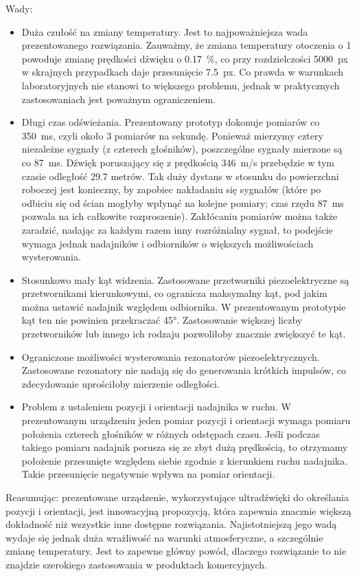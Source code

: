 Wady:
\begin{itemize}
 \item Duża czułość na zmiany temperatury. Jest to najpoważniejsza wada prezentowanego rozwiązania.
 Zauważmy, że zmiana temperatury otoczenia o \SI{1}{\degC} powoduje zmianę prędkości dźwięku o \SI{0,17}{\%},
 co przy rozdzielczości \SI{5000}{px} w skrajnych przypadkach daje przesunięcie \SI{7.5}{px}.
 Co prawda w warunkach laboratoryjnych nie stanowi to większego problemu, jednak w praktycznych zastosowaniach
 jest poważnym ograniczeniem.
 
 \item Długi czas odświeżania. Prezentowany prototyp dokonuje pomiarów co \SI{350}{ms}, czyli około 3 pomiarów 
 na sekundę. Ponieważ mierzymy cztery niezależne sygnały (z czterech głośników), poszczególne sygnały mierzone są co \SI{87}{ms}.
  Dźwięk poruszający się z prędkością \SI{346}{m/s}  przebędzie  w tym czasie odległość 29.7 metrów.
 Tak duży dystans w stosunku do powierzchni roboczej jest konieczny, by zapobiec nakładaniu się sygnałów
 (które po odbiciu się od ścian mogłyby wpłynąć na kolejne pomiary; czas rzędu \SI{87}{ms} pozwala 
 na ich całkowite rozproszenie).
 Zakłócaniu pomiarów można także zaradzić, nadając za każdym razem inny rozróżnialny sygnał, to podejście 
 wymaga jednak nadajników i odbiorników o większych możliwościach wysterowania.
 
 \item Stosunkowo mały kąt widzenia. Zastosowane przetworniki piezoelektryczne są przetwornikami kierunkowymi, co 
 ogranicza  maksymalny kąt, pod jakim można ustawić nadajnik względem odbiornika. W prezentowanym 
 prototypie kąt ten nie powinien przekraczać \ang{45}. Zastosowanie większej liczby przetworników lub innego ich rodzaju
 pozwoliłoby znacznie zwiększyć te kąt.

 \item Ograniczone możliwości wysterowania rezonatorów piezoelektrycznych. 
 Zastosowane rezonatory nie nadają się do generowania krótkich impulsów, co zdecydowanie uprościłoby mierzenie odległości.
 
 \item Problem z ustaleniem pozycji i orientacji nadajnika w ruchu. W prezentowanym urządzeniu 
 jeden pomiar pozycji i orientacji wymaga pomiaru położenia czterech głośników w różnych odstępach czasu.
 Jeśli podczas takiego pomiaru nadajnik porusza się ze zbyt dużą prędkością, to otrzymamy położenie
 przesunięte względem siebie zgodnie z kierunkiem ruchu nadajnika. Takie przesunięcie negatywnie wpływa na 
 pomiar orientacji. 
\end{itemize}


Reasumując: prezentowane urządzenie, wykorzystujące ultradźwięki do określania pozycji i orientacji,
jest innowacyjną propozycją, która zapewnia znacznie większą dokładność niż wszystkie inne dostępne rozwiązania.
Najistotniejszą jego wadą wydaje się jednak duża wrażliwość na warunki atmosferyczne, a szczególnie zmianę temperatury.
Jest to zapewne główny powód, dlaczego rozwiązanie to nie znajdzie  szerokiego zastosowania w produktach komercyjnych.



